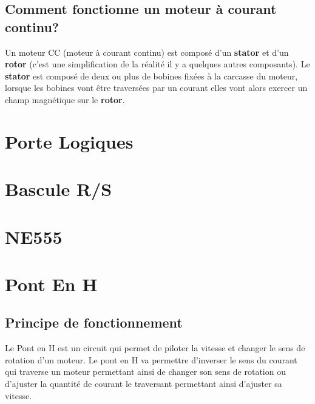 \documentclass[10pt,a4paper]{article}
\begin{document}
\subsection{Comment fonctionne un moteur à courant continu?}

Un moteur CC (moteur à courant continu) est composé d'un \textbf{stator} et d'un \textbf{rotor} (c'est une simplification de la réalité il y a quelques autres composants). 
Le \textbf{stator} est composé de deux ou plus de bobines fixées à la carcasse du moteur, lorsque les bobines vont être traversées par un courant elles vont alors exercer un champ magnétique sur le \textbf{rotor}.  

\section{Porte Logiques}

\section{Bascule R/S}

\section{NE555}

\section{Pont En H}

\subsection{Principe de fonctionnement}
Le Pont en H est un circuit qui permet de piloter la vitesse et changer le sens de rotation d'un
moteur. Le pont en H va permettre d'inverser le sens du courant qui traverse un moteur permettant
ainsi de changer son sens de rotation ou d'ajuster la quantité de courant le traversant permettant
ainsi d'ajuster sa vitesse.
\end{document}
